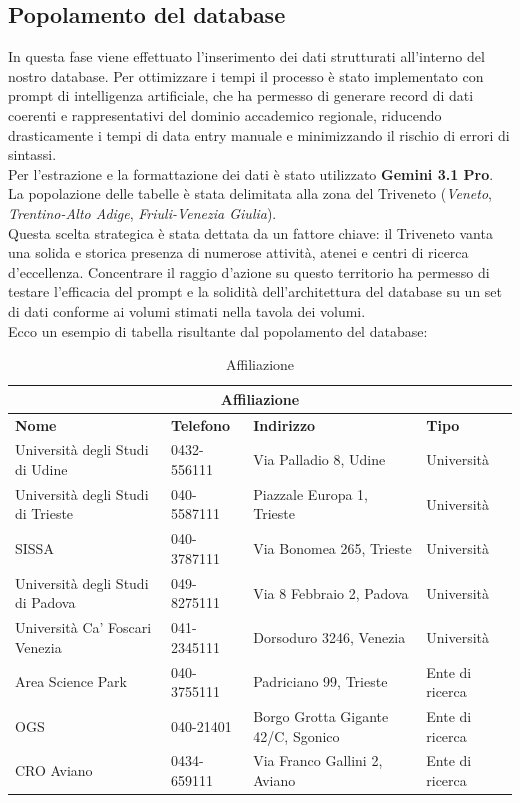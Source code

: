 \documentclass[a4paper,12pt]{article}
\begin{document}
\subsection{Popolamento del database} \label{subsec:popolamento}
In questa fase viene effettuato l'inserimento dei dati strutturati all'interno del nostro database. Per ottimizzare i tempi il processo è stato implementato con prompt di intelligenza artificiale, che ha permesso di generare record di dati coerenti e rappresentativi del dominio accademico regionale, riducendo drasticamente i tempi di data entry manuale e minimizzando il rischio di errori di sintassi.
\\Per l'estrazione e la formattazione dei dati è stato utilizzato \textbf{Gemini 3.1 Pro}.
La popolazione delle tabelle è stata delimitata alla zona del Triveneto (\textit{Veneto}, \textit{Trentino-Alto Adige}, \textit{Friuli-Venezia Giulia}).
\\Questa scelta strategica è stata dettata da un fattore chiave: il Triveneto vanta una solida e storica presenza di numerose attività, atenei e centri di ricerca d'eccellenza.
Concentrare il raggio d'azione su questo territorio ha permesso di testare l'efficacia del prompt e la solidità dell'architettura del database su un set di dati conforme ai volumi stimati nella tavola dei volumi.
\\ Ecco un esempio di tabella risultante dal popolamento del database:

\begin{table}[H]
\centering
\caption{Affiliazione}
\small
\begin{tabular}{llll}
\toprule
\multicolumn{4}{c}{\textbf{Affiliazione}} \\
\midrule
\textbf{Nome} & \textbf{Telefono} & \textbf{Indirizzo} & \textbf{Tipo} \\
\midrule
Università degli Studi di Udine   & 0432-556111 & Via Palladio 8, Udine              & Università      \\
Università degli Studi di Trieste & 040-5587111 & Piazzale Europa 1, Trieste         & Università      \\
SISSA                             & 040-3787111 & Via Bonomea 265, Trieste           & Università      \\
Università degli Studi di Padova  & 049-8275111 & Via 8 Febbraio 2, Padova           & Università      \\
Università Ca' Foscari Venezia    & 041-2345111 & Dorsoduro 3246, Venezia            & Università      \\
Area Science Park                 & 040-3755111 & Padriciano 99, Trieste             & Ente di ricerca \\
OGS                               & 040-21401   & Borgo Grotta Gigante 42/C, Sgonico & Ente di ricerca \\
CRO Aviano                        & 0434-659111 & Via Franco Gallini 2, Aviano       & Ente di ricerca \\
\bottomrule
\end{tabular}
\end{table}
\end{document}
